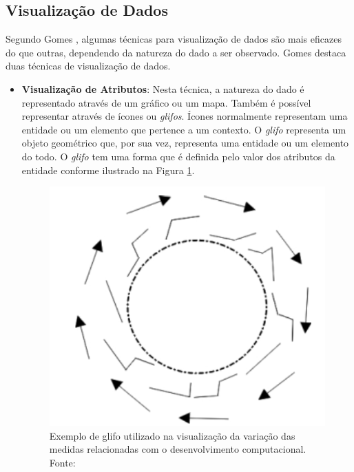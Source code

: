 \subsection{Visualização de Dados}
Segundo Gomes \cite{gomes_percepcao_2011}, algumas técnicas para visualização de dados são mais eficazes do que outras, dependendo da natureza do dado a ser observado. Gomes destaca duas técnicas de visualização de dados.

\begin{itemize}
\item \textbf{Visualização de Atributos}: Nesta técnica, a natureza do dado é representado através de um gráfico ou um mapa. Também é possível representar através de ícones ou \textit{glifos}. Ícones normalmente representam uma entidade ou um elemento que pertence a um contexto. O \textit{glifo} representa um objeto geométrico que, por sua vez, representa uma entidade ou um elemento do todo. O \textit{glifo} tem uma forma que é definida pelo valor dos atributos da entidade conforme ilustrado na Figura \ref{img:glifo}.
\graphicspath{{figuras/}}
\begin{figure}[h]
\centering
\includegraphics[scale=0.5]{Glifo}
\caption{Exemplo de glifo utilizado na visualização da variação das medidas relacionadas com o desenvolvimento computacional. Fonte: \cite{gomes_percepcao_2011}}
\label{img:glifo}
\end{figure}


\end{itemize}
